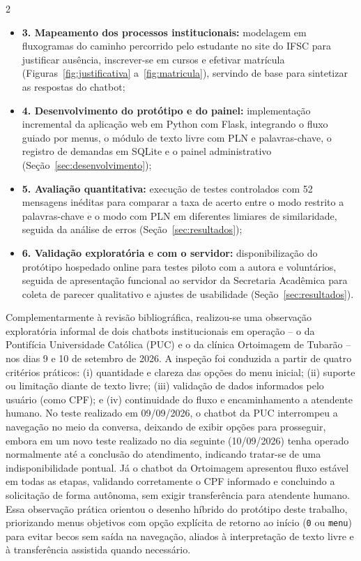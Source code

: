 \documentclass[10pt]{article}
\begin{document}
\begin{multicols}{2}
\begin{itemize}
  \item \textbf{3. Mapeamento dos processos institucionais:} modelagem
  em fluxogramas do caminho percorrido pelo estudante no site do IFSC
  para justificar ausência, inscrever-se em cursos e efetivar matrícula
  (Figuras~\ref{fig:justificativa} a~\ref{fig:matricula}), servindo de
  base para sintetizar as respostas do chatbot;

  \item \textbf{4. Desenvolvimento do protótipo e do painel:}
  implementação incremental da aplicação web em Python com Flask,
  integrando o fluxo guiado por menus, o módulo de texto livre com PLN e
  palavras-chave, o registro de demandas em SQLite e o painel
  administrativo (Seção~\ref{sec:desenvolvimento});

  \item \textbf{5. Avaliação quantitativa:} execução de testes
  controlados com 52 mensagens inéditas para comparar a taxa de acerto
  entre o modo restrito a palavras-chave e o modo com PLN em diferentes
  limiares de similaridade, seguida da análise de erros
  (Seção~\ref{sec:resultados});

  \item \textbf{6. Validação exploratória e com o servidor:}
  disponibilização do protótipo hospedado online para testes piloto com
  a autora e voluntários, seguida de apresentação funcional ao servidor
  da Secretaria Acadêmica para coleta de parecer qualitativo e ajustes
  de usabilidade (Seção~\ref{sec:resultados}).
\end{itemize}
  
Complementarmente à revisão bibliográfica, realizou-se uma observação
exploratória informal de dois chatbots institucionais em operação -- o
da Pontifícia Universidade Católica (PUC) e o da clínica Ortoimagem de
Tubarão -- nos dias 9 e 10 de setembro de 2026. A inspeção foi conduzida
a partir de quatro critérios práticos: (i) quantidade e clareza das
opções do menu inicial; (ii) suporte ou limitação diante de texto livre;
(iii) validação de dados informados pelo usuário (como CPF); e
(iv) continuidade do fluxo e encaminhamento a atendente humano. No teste
realizado em 09/09/2026, o chatbot da PUC interrompeu a navegação no
meio da conversa, deixando de exibir opções para prosseguir, embora em
um novo teste realizado no dia seguinte (10/09/2026) tenha operado
normalmente até a conclusão do atendimento, indicando tratar-se de uma
indisponibilidade pontual. Já o chatbot da Ortoimagem apresentou fluxo
estável em todas as etapas, validando corretamente o CPF informado e
concluindo a solicitação de forma autônoma, sem exigir transferência
para atendente humano. Essa observação prática orientou o desenho
híbrido do protótipo deste trabalho, priorizando menus objetivos com
opção explícita de retorno ao início (\texttt{0} ou \texttt{menu}) para
evitar becos sem saída na navegação, aliados à interpretação de texto
livre e à transferência assistida quando necessário.


\end{multicols}
\end{document}
